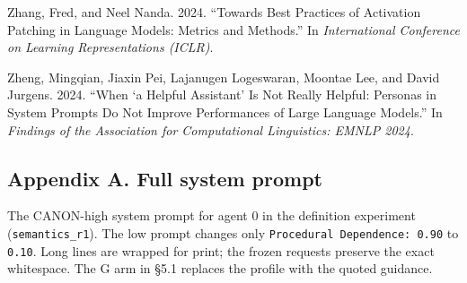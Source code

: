 \documentclass[
  11pt]{article}
\newlength{\cslhangindent}
\newenvironment{CSLReferences}[2] %
 {\begin{list}{}{%
  \setlength{\itemindent}{0pt}
  \setlength{\leftmargin}{0pt}
  \setlength{\parsep}{0pt}
  \ifodd #1
   \setlength{\leftmargin}{\cslhangindent}
   \setlength{\itemindent}{-1\cslhangindent}
  \fi
  \setlength{\itemsep}{#2\baselineskip}}}
 {\end{list}}
\begin{document}
\begin{CSLReferences}{1}{0}
Zhang, Fred, and Neel Nanda. 2024. {``Towards Best Practices of
Activation Patching in Language Models: Metrics and Methods.''} In
\emph{International Conference on Learning Representations (ICLR)}.

Zheng, Mingqian, Jiaxin Pei, Lajanugen Logeswaran, Moontae Lee, and
David Jurgens. 2024. {``When {`a Helpful Assistant'} Is Not Really
Helpful: Personas in System Prompts Do Not Improve Performances of Large
Language Models.''} In \emph{Findings of the Association for
Computational Linguistics: EMNLP 2024}.

\end{CSLReferences}

\subsection{Appendix A. Full system
prompt}\label{appendix-a.-full-system-prompt}

The CANON-high system prompt for agent 0 in the definition experiment
(\texttt{semantics\_r1}). The low prompt changes only
\texttt{Procedural\ Dependence:\ 0.90} to \texttt{0.10}. Long lines are
wrapped for print; the frozen requests preserve the exact whitespace.
The G arm in §5.1 replaces the profile with the quoted guidance.
\end{document}
